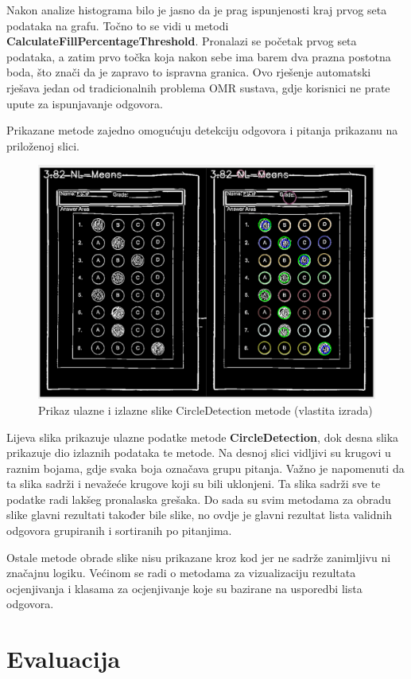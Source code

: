 \documentclass{foi}
\begin{document}
Nakon analize histograma bilo je jasno da je prag ispunjenosti kraj prvog seta podataka na grafu. Točno to se vidi u metodi \textbf{CalculateFillPercentageThreshold}. Pronalazi se početak prvog seta podataka, a zatim prvo točka koja nakon sebe ima barem dva prazna postotna boda, što znači da je zapravo to ispravna granica. Ovo rješenje automatski rješava jedan od tradicionalnih problema OMR sustava, gdje korisnici ne prate upute za ispunjavanje odgovora.

Prikazane metode zajedno omogućuju detekciju odgovora i pitanja prikazanu na priloženoj slici.

\begin{figure}[H]
\centering
\includegraphics[width=0.8\linewidth]{slike/CircleDetectionComp.png}
\caption{Prikaz ulazne i izlazne slike CircleDetection metode (vlastita izrada)}
\end{figure}

Lijeva slika prikazuje ulazne podatke metode \textbf{CircleDetection}, dok desna slika prikazuje dio izlaznih podataka te metode. Na desnoj slici vidljivi su krugovi u raznim bojama, gdje svaka boja označava grupu pitanja. Važno je napomenuti da ta slika sadrži i nevažeće krugove koji su bili uklonjeni. Ta slika sadrži sve te podatke radi lakšeg pronalaska grešaka. Do sada su svim metodama za obradu slike glavni rezultati također bile slike, no ovdje je glavni rezultat lista validnih odgovora grupiranih i sortiranih po pitanjima.

Ostale metode obrade slike nisu prikazane kroz kod jer ne sadrže zanimljivu ni značajnu logiku. Većinom se radi o metodama za vizualizaciju rezultata ocjenjivanja i klasama za ocjenjivanje koje su bazirane na usporedbi lista odgovora.

\chapter{Evaluacija}
\end{document}
